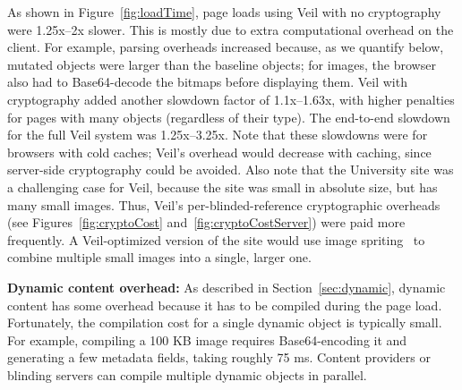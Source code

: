 As shown in Figure~\ref{fig:loadTime}, page loads using Veil with
no cryptography were 1.25x--2x slower. This is mostly
due to extra computational overhead on the client.
For example, parsing overheads increased because,
as we quantify below, mutated objects were larger than
the baseline objects; for images, the browser also
had to Base64-decode the bitmaps before displaying
them.
Veil with cryptography added another slowdown factor
of 1.1x--1.63x, with higher penalties for pages
with many objects (regardless of their type). The
end-to-end slowdown for the full Veil system
was 1.25x--3.25x. Note that these slowdowns were for
browsers with cold caches; 
Veil's overhead would
decrease with caching, since server-side
cryptography could be avoided. Also note that
the University site was a challenging case for
Veil, because the site was small in absolute size,
but has many small images. Thus,
Veil's per-blinded-reference cryptographic
overheads (see Figures~\ref{fig:cryptoCost} and~\ref{fig:cryptoCostServer}) %
were paid more frequently. A Veil-optimized
version of the site would use image spriting~\cite{spriting}
to combine multiple small images into a single,
larger one.

\noindent
\textbf{Dynamic content overhead:}
As described in Section~\ref{sec:dynamic},
dynamic content has some overhead because it
has to be compiled during the page load.
Fortunately, the compilation cost for a single dynamic object
is typically small. For example, compiling a
100 KB image requires Base64-encoding it and
generating a few metadata fields, taking roughly
75 ms. Content providers or blinding servers 
can compile multiple dynamic objects in parallel.

